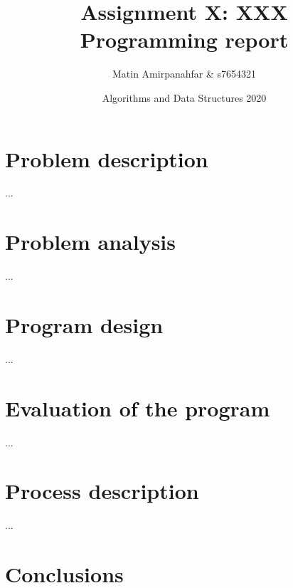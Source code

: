 \documentclass[a4paper]{article}
\begin{document}
\title{Assignment X: XXX \\ Programming report}
\author{Matin Amirpanahfar \& s7654321}
\date{Algorithms and Data Structures 2020}

\maketitle



\section{Problem description}

...

\section{Problem analysis}

...

\section{Program design}

...

\section{Evaluation of the program}

...

%

\section{Process description}

...

\section{Conclusions}
\end{document}
